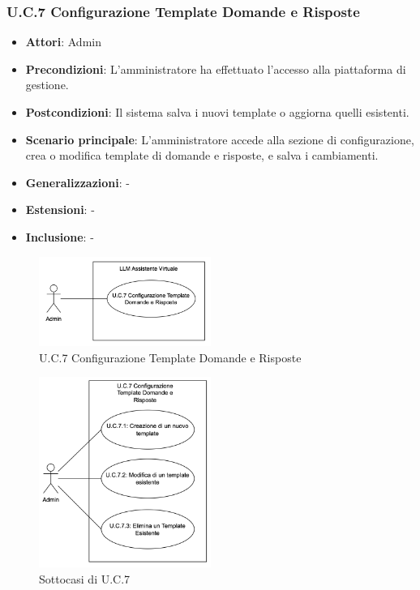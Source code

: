 \subsubsection{U.C.7 Configurazione Template Domande e Risposte}
\begin{itemize}
    \item \textbf{Attori}: Admin
    \item \textbf{Precondizioni}: L’amministratore ha effettuato l’accesso alla piattaforma di gestione.
    \item \textbf{Postcondizioni}: Il sistema salva i nuovi template o aggiorna quelli esistenti.
    \item \textbf{Scenario principale}: L’amministratore accede alla sezione di configurazione, crea o modifica template di domande e risposte, e salva i cambiamenti.
    \item \textbf{Generalizzazioni}: -
    \item \textbf{Estensioni}: -
    \item \textbf{Inclusione}: -
\end{itemize}
\begin{figure}[h!]
    \centering
    \includegraphics[width=0.5\textwidth]{img/UC7.png}
    \caption{U.C.7 Configurazione Template Domande e Risposte}
\end{figure}
\begin{figure}[h!]
    \centering
    \includegraphics[width=0.5\textwidth]{img/UC7p1.png}
    \caption{Sottocasi di U.C.7}
\end{figure}
\newpage
